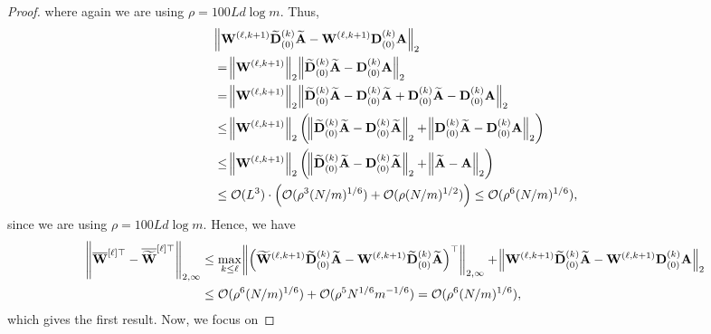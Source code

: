 \begin{proof}
	where again we are using $\rho = 100Ld \log m$.
	Thus,
	\begingroup \allowdisplaybreaks
	\begin{align}
		&\norm{\mathbf{W}^{(\ell, k+1)} \widetilde{\mathbf{D}}_{(0)}^{(k)} \widetilde{\mathbf{A}} - \mathbf{W}^{(\ell, k+1)} \mathbf{D}_{(0)}^{(k)} \mathbf{A}}_{2} \nonumber\\&= \norm{\mathbf{W}^{(\ell, k+1)}}_2 \norm{\widetilde{\mathbf{D}}_{(0)}^{(k)} \widetilde{\mathbf{A}} -  \mathbf{D}_{(0)}^{(k)} \mathbf{A}}_{2} \nonumber\\&
		= \norm{\mathbf{W}^{(\ell, k+1)}}_2 \norm{\widetilde{\mathbf{D}}_{(0)}^{(k)} \widetilde{\mathbf{A}} - \mathbf{D}_{(0)}^{(k)} \widetilde{\mathbf{A}} + \mathbf{D}_{(0)}^{(k)} \widetilde{\mathbf{A}} -  \mathbf{D}_{(0)}^{(k)} \mathbf{A}}_{2}  \nonumber\\&
		\le \norm{\mathbf{W}^{(\ell, k+1)}}_2 \left(\norm{\widetilde{\mathbf{D}}_{(0)}^{(k)} \widetilde{\mathbf{A}} - \mathbf{D}_{(0)}^{(k)} \widetilde{\mathbf{A}}}_2 + \norm{\mathbf{D}_{(0)}^{(k)} \widetilde{\mathbf{A}} -  \mathbf{D}_{(0)}^{(k)} \mathbf{A}}_{2} \right) \nonumber\\&
		\le \norm{\mathbf{W}^{(\ell, k+1)}}_2 \left(\norm{\widetilde{\mathbf{D}}_{(0)}^{(k)} \widetilde{\mathbf{A}} - \mathbf{D}_{(0)}^{(k)} \widetilde{\mathbf{A}}}_2 + \norm{ \widetilde{\mathbf{A}} -  \mathbf{A}}_{2} \right) \nonumber
		\\&
		\le \mathcal{O}(L^3) \cdot \left(\mathcal{O}(\rho^{3} (N/m)^{1/6}) + \mathcal{O}(\rho (N/m)^{1/2})\right) \le \mathcal{O}(\rho^{6} (N/m)^{1/6}) \label{eq:DAtilde_DA},
	\end{align}
	\endgroup
	since  we are using $\rho = 100Ld \log m$.
	Hence, we have 
	\begingroup\allowdisplaybreaks
	\begin{align*}
		\norm{\overline{\mathbf{W}}^{[\ell]\top} - \overline{\widetilde{\mathbf{W}}}^{[\ell]\top}}_{2, \infty} & \le  \max_{k \le \ell} \norm{\left(\widetilde{\mathbf{W}}^{(\ell, k+1)} \widetilde{\mathbf{D}}_{(0)}^{(k)} \widetilde{\mathbf{A}} - \mathbf{W}^{(\ell, k+1)} \widetilde{\mathbf{D}}_{(0)}^{(k)} \widetilde{\mathbf{A}}\right)^{\top}}_{2, \infty} + \norm{\mathbf{W}^{(\ell, k+1)} \widetilde{\mathbf{D}}_{(0)}^{(k)} \widetilde{\mathbf{A}} - \mathbf{W}^{(\ell, k+1)} \mathbf{D}_{(0)}^{(k)} \mathbf{A}}_{2} \\&
		\le \mathcal{O}(\rho^{6} (N/m)^{1/6}) + \mathcal{O}(\rho^{5} N^{1/6} m^{-1/6}) = \mathcal{O}(\rho^{6} (N/m)^{1/6}),
	\end{align*}
	\endgroup
	which gives the first result.
	Now, we focus on 

\end{proof}
